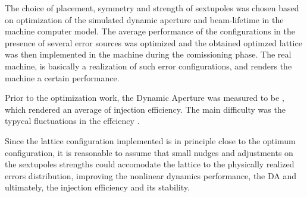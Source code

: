     The choice of placement, symmetry and strength of sextupoles was chosen based on optimization of the simulated dynamic aperture and beam-lifetime in the machine computer model. The average performance of the configurations in the presence of several error sources was optimized and the obtained optimzed lattice was then implemented in the machine during the comissioning phase. The real machine, is basically a realization of such error configurations, and renders the machine a certain performance.

    Prior to the optimization work, the Dynamic Aperture was measured to be , which rendered an average of  injection efficiency. The main difficulty was the typycal fluctuations in the effciency .

    Since the lattice configuration implemented is in principle close to the optimum configuration, it is reasonable to assume that small nudges and adjustments on the sextupoles strengths could accomodate the lattice to the physically realized errors distribution, improving the nonlinear dynamics performance, the DA and ultimately, the injection efficiency and its stability.

